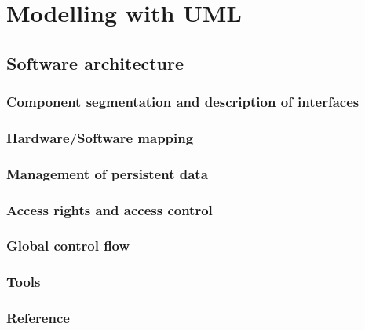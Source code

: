 \section{Modelling with UML}
\subsection{Software architecture}
\subsubsection{Component segmentation and description of interfaces}
\subsubsection{Hardware/Software mapping}
\subsubsection{Management of persistent data}
\subsubsection{Access rights and access control}
\subsubsection{Global control flow}
\subsubsection{Tools}
\subsubsection{Reference}
